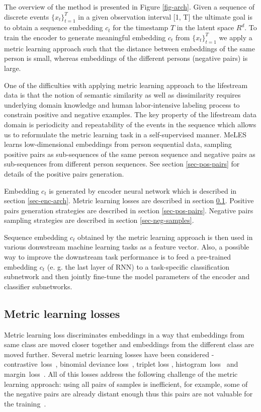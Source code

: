 \documentclass{article}
\begin{document}
The overview of the method is presented in Figure \ref{fig-arch}. Given a sequence of discrete events $\{x_t \}^T_{t=1}$ in a given observation interval [1, T] the ultimate goal is to obtain a sequence embedding $c_t$ for the timestamp $T$ in the latent space $R^d$. To train the encoder to generate meaningful embedding $c_t$ from $\{x_t \}^T_{t=1}$ we apply a metric learning approach such that the distance between embeddings of the same person is small, whereas embeddings of the different persons (negative pairs) is large.

One of the difficulties with applying metric learning approach to the lifestream data is that the notion of semantic similarity as well as dissimilarity requires underlying domain knowledge and human labor-intensive labeling process to constrain positive and negative examples. 
The key property of the lifestream data domain is periodicity and repeatability of the events in the sequence which allows us to reformulate the metric learning task in a self-supervised manner. MeLES learns low-dimensional embeddings from person sequential data, sampling positive pairs as sub-sequences of the same person sequence and negative pairs as sub-sequences from different person sequences. See section \ref{sec-pos-pairs} for details of the positive pairs generation.

Embedding $c_t$ is generated by encoder neural network which is described in section \ref{sec-enc-arch}. Metric learning losses are described in section \ref{sec-ml-loss}. Positive pairs generation strategies are described in section \ref{sec-pos-pairs}. Negative pairs sampling strategies are described in section \ref{sec-neg-samples}.

Sequence embedding $c_t$ obtained by the metric learning approach is then used in various donwstream machine learning tasks as a feature vector. Also, a possible way to improve the downstream task performance is to feed a pre-trained embedding $c_t$ (e. g. the last layer of RNN) to a task-specific classification subnetwork and then jointly fine-tune the model parameters of the encoder and classifier subnetworks.


\subsection{Metric learning losses} \label{sec-ml-loss}

Metric learning loss discriminates embeddings in a way that embeddings from same class are moved closer together and embeddings from the different class are moved further. Several metric learning losses have been considered - contrastive~loss~\cite{Hadsell2006DimensionalityRB}, binomial deviance loss~\cite{Yi2014DeepML}, triplet loss \cite{Hoffer2015DeepML}, histogram~loss~\cite{Ustinova2016LearningDE} and margin~loss~\cite{Manmatha2017SamplingMI}. All of this losses address the following challenge of the metric learning approach: using all pairs of samples is inefficient, for example, some of the negative pairs are already distant enough thus this pairs are not valuable for the training~\cite{SimoSerra2015DiscriminativeLO, Manmatha2017SamplingMI, Schroff2015FaceNetAU}.
\end{document}
